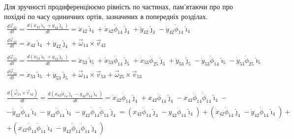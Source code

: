 \documentclass[12pt]{article}
\begin{document}
 	Для зручності продиференціюємо рівність по частинах, пам'ятаючи про про похідні по часу одиничних ортів, зазначених в попередніх розділах.
 	\begin{gather*} 
 	\frac{d\vec{v}_{42}}{d t} = \frac{d(\dot{x}_{42} \hat{\imath}_{4} + \dot{y}_{42} \hat{\jmath}_{4})}{d t} = \ddot{x}_{42} \hat{\imath}_{4} + \dot{x}_{42} \dot{\phi}_{14} \hat{\jmath}_{4} + \ddot{y}_{42} \hat{\jmath}_{4} - \dot{y}_{42} \dot{\phi}_{14} \hat{\imath}_{4}\\
 	\frac{d\vec{v}_{42}}{d t} = \ddot{x}_{42} \hat{\imath}_{4} + \ddot{y}_{42} \hat{\jmath}_{4} + \vec{\omega}_{14} \times \vec{v}_{42}\\
 	\\
 	\frac{d\vec{v}_{53}}{d t} = \frac{d(\dot{x}_{53} \hat{\imath}_{5} + \dot{y}_{53} \hat{\jmath}_{5})} {d t} = \ddot{x}_{53} \hat{\imath}_{5} + \dot{x}_{53} \dot{\phi}_{14} \hat{\jmath}_{5}+ \dot{x}_{53} \dot{\phi}_{25} \hat{\jmath}_{5} + \ddot{y}_{53} \hat{\jmath}_{5} - \dot{y}_{53} \dot{\phi}_{14} \hat{\imath}_{5} - \dot{y}_{53} \dot{\phi}_{25} \hat{\imath}_{5}\\
 	\frac{d\vec{v}_{53}}{d t} = \ddot{x}_{53} \hat{\imath}_{5} + \ddot{y}_{53} \hat{\jmath}_{5} + \vec{\omega}_{14} \times \vec{v}_{53} + \vec{\omega}_{25} \times \vec{v}_{53}\\
 	\\
 	\end{gather*}
 	\begin{multline*}
 	\frac{d(\vec{\omega}_{14} \times \vec{r}_{42})}{d t} = \frac{d(x_{42} \dot{\phi}_{14} \hat{\jmath}_{4} - y_{42} \dot{\phi}_{14} \hat{\imath}_{4})}{d t} = \dot{x}_{42} \dot{\phi}_{14} \hat{\jmath}_4 + x_{42} \ddot{\phi}_{14} \hat{\jmath}_4 -  x_{42} \dot{\phi}_{14} \dot{\phi}_{14} \hat{\imath}_4 - \\ - \dot{y}_{42} \dot{\phi}_{14} \hat{\imath}_4 - {y}_{42} \ddot{\phi}_{14} \hat{\imath}_4 - {y}_{42} \dot{\phi}_{14} \dot{\phi}_{14} \hat{\jmath}_4 =(x_{42} \ddot{\phi}_{14} \hat{\jmath}_4 - {y}_{42} \ddot{\phi}_{14} \hat{\imath}_4) + (\dot{x}_{42} \dot{\phi}_{14} \hat{\jmath}_4 - \dot{y}_{42} \dot{\phi}_{14} \hat{\imath}_4) + \\ + (x_{42} \dot{\phi}_{14} \dot{\phi}_{14} \hat{\imath}_4 - {y}_{42} \dot{\phi}_{14} \dot{\phi}_{14} \hat{\jmath}_4)
 	\end{multline*}
\end{document}
